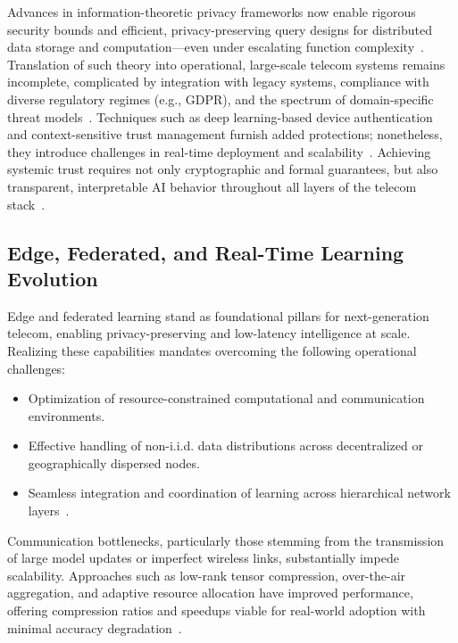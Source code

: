 \documentclass[sigconf]{acmart}
\begin{document}
Advances in information-theoretic privacy frameworks now enable rigorous security bounds and efficient, privacy-preserving query designs for distributed data storage and computation—even under escalating function complexity~\cite{ref48}. Translation of such theory into operational, large-scale telecom systems remains incomplete, complicated by integration with legacy systems, compliance with diverse regulatory regimes (e.g., GDPR), and the spectrum of domain-specific threat models~\cite{ref10,ref24,ref49}. Techniques such as deep learning-based device authentication and context-sensitive trust management furnish added protections; nonetheless, they introduce challenges in real-time deployment and scalability~\cite{ref18,ref23}. Achieving systemic trust requires not only cryptographic and formal guarantees, but also transparent, interpretable AI behavior throughout all layers of the telecom stack~\cite{ref19,ref26,ref49}.

\subsection{Edge, Federated, and Real-Time Learning Evolution}

Edge and federated learning stand as foundational pillars for next-generation telecom, enabling privacy-preserving and low-latency intelligence at scale. Realizing these capabilities mandates overcoming the following operational challenges:
\begin{itemize}
    \item Optimization of resource-constrained computational and communication environments.
    \item Effective handling of non-i.i.d. data distributions across decentralized or geographically dispersed nodes.
    \item Seamless integration and coordination of learning across hierarchical network layers~\cite{ref17,ref19,ref23,ref25,ref26,ref39,ref42,ref48}.
\end{itemize}

Communication bottlenecks, particularly those stemming from the transmission of large model updates or imperfect wireless links, substantially impede scalability. Approaches such as low-rank tensor compression, over-the-air aggregation, and adaptive resource allocation have improved performance, offering compression ratios and speedups viable for real-world adoption with minimal accuracy degradation~\cite{ref39,ref42,ref48}. 
\end{document}
